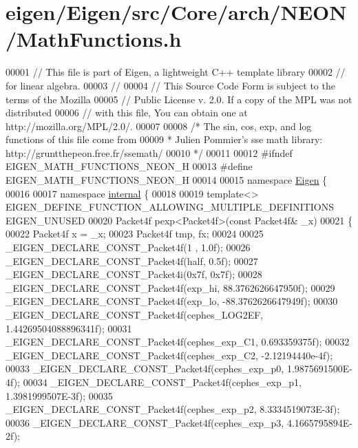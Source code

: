 \hypertarget{eigen_2_eigen_2src_2_core_2arch_2_n_e_o_n_2_math_functions_8h_source}{}\section{eigen/\+Eigen/src/\+Core/arch/\+N\+E\+O\+N/\+Math\+Functions.h}
\label{eigen_2_eigen_2src_2_core_2arch_2_n_e_o_n_2_math_functions_8h_source}

\begin{DoxyCode}
00001 \textcolor{comment}{// This file is part of Eigen, a lightweight C++ template library}
00002 \textcolor{comment}{// for linear algebra.}
00003 \textcolor{comment}{//}
00004 \textcolor{comment}{// This Source Code Form is subject to the terms of the Mozilla}
00005 \textcolor{comment}{// Public License v. 2.0. If a copy of the MPL was not distributed}
00006 \textcolor{comment}{// with this file, You can obtain one at http://mozilla.org/MPL/2.0/.}
00007 
00008 \textcolor{comment}{/* The sin, cos, exp, and log functions of this file come from}
00009 \textcolor{comment}{ * Julien Pommier's sse math library: http://gruntthepeon.free.fr/ssemath/}
00010 \textcolor{comment}{ */}
00011 
00012 \textcolor{preprocessor}{#ifndef EIGEN\_MATH\_FUNCTIONS\_NEON\_H}
00013 \textcolor{preprocessor}{#define EIGEN\_MATH\_FUNCTIONS\_NEON\_H}
00014 
00015 \textcolor{keyword}{namespace }\hyperlink{namespace_eigen}{Eigen} \{
00016 
00017 \textcolor{keyword}{namespace }\hyperlink{namespaceinternal}{internal} \{
00018 
00019 \textcolor{keyword}{template}<> EIGEN\_DEFINE\_FUNCTION\_ALLOWING\_MULTIPLE\_DEFINITIONS EIGEN\_UNUSED
00020 Packet4f pexp<Packet4f>(\textcolor{keyword}{const} Packet4f& \_x)
00021 \{
00022   Packet4f x = \_x;
00023   Packet4f tmp, fx;
00024 
00025   \_EIGEN\_DECLARE\_CONST\_Packet4f(1 , 1.0f);
00026   \_EIGEN\_DECLARE\_CONST\_Packet4f(half, 0.5f);
00027   \_EIGEN\_DECLARE\_CONST\_Packet4i(0x7f, 0x7f);
00028   \_EIGEN\_DECLARE\_CONST\_Packet4f(exp\_hi,  88.3762626647950f);
00029   \_EIGEN\_DECLARE\_CONST\_Packet4f(exp\_lo, -88.3762626647949f);
00030   \_EIGEN\_DECLARE\_CONST\_Packet4f(cephes\_LOG2EF, 1.44269504088896341f);
00031   \_EIGEN\_DECLARE\_CONST\_Packet4f(cephes\_exp\_C1, 0.693359375f);
00032   \_EIGEN\_DECLARE\_CONST\_Packet4f(cephes\_exp\_C2, -2.12194440e-4f);
00033   \_EIGEN\_DECLARE\_CONST\_Packet4f(cephes\_exp\_p0, 1.9875691500E-4f);
00034   \_EIGEN\_DECLARE\_CONST\_Packet4f(cephes\_exp\_p1, 1.3981999507E-3f);
00035   \_EIGEN\_DECLARE\_CONST\_Packet4f(cephes\_exp\_p2, 8.3334519073E-3f);
00036   \_EIGEN\_DECLARE\_CONST\_Packet4f(cephes\_exp\_p3, 4.1665795894E-2f);

\end{DoxyCode}
